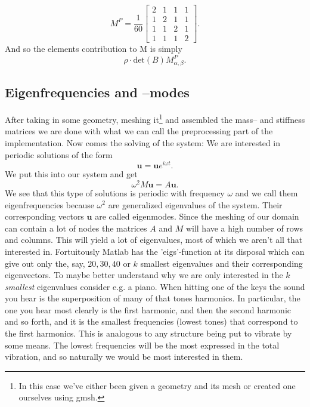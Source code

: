 \documentclass[paper=a4, fontsize=11pt]{scrartcl} %
\begin{document}
\begin{equation*}
M^P = \frac{1}{60}\begin{bmatrix}
2 & 1 & 1 & 1 \\
1 & 2 & 1 & 1 \\
1 & 1 & 2 & 1 \\
1 & 1 & 1 & 2
\end{bmatrix}.
\end{equation*}
And so the elements contribution to M is simply
\begin{equation}
\rho\cdot \text{det}(B)M^P_{\alpha,\beta}.
\end{equation}

\subsection*{Eigenfrequencies and --modes}

After taking in some geometry, meshing it\footnote{In this case we've either been given a geometry and its mesh or created one ourselves using gmsh.} and assembled the mass-- and stiffness matrices we are done with what we can call the preprocessing part of the implementation. Now comes the solving of the system: We are interested in periodic solutions of the form
\begin{equation*}
\boldsymbol{u} = \boldsymbol{u}e^{i\omega t}.
\end{equation*}
We put this into our system and get
\begin{equation*}
\omega^2M\boldsymbol{u} = A\boldsymbol{u}.
\end{equation*}
We see that this type of solutions is periodic with frequency $\omega$ and we call them eigenfrequencies because $\omega^2$ are generalized eigenvalues of the system. Their corresponding vectors $\boldsymbol{u}$ are called eigenmodes. Since the meshing of our domain can contain a lot of nodes the matrices $A$ and $M$ will have a high number of rows and columns. This will yield a lot of eigenvalues, most of which we aren't all that interested in. Fortuitously Matlab has the 'eigs'-function at its disposal which can give out only the, say, $20, 30, 40$ or $k$ smallest eigenvalues and their corresponding eigenvectors. To maybe better understand why we are only interested in the $k$ \textit{smallest} eigenvalues consider e.g. a piano. When hitting one of the keys the sound you hear is the superposition of many of that tones harmonics. In particular, the one you hear most clearly is the first harmonic, and then the second harmonic and so forth, and it is the smallest frequencies (lowest tones) that correspond to the first harmonics. This is analogous to any structure being put to vibrate by some means. The lowest frequencies will be the most expressed in the total vibration, and so naturally we would be most interested in them.
\end{document}
